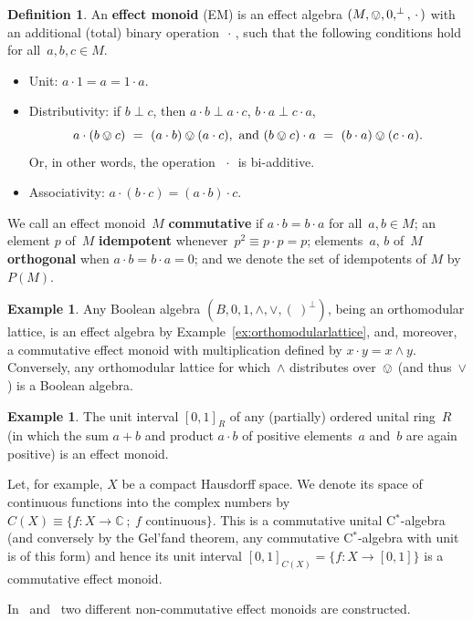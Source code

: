 \documentclass[10pt,conference]{IEEEtran}
\newcommand{\CC}{\mathbb{C}}
\newcommand\Define[1]{\textbf{#1}}
\newcounter{counter}
\theoremstyle{definition}
\newtheorem{definition}[counter]{Definition}
\newtheorem{example}[counter]{Example}
\begin{document}
\begin{definition}\label{def:effectmonoid}
    An \Define{effect monoid} (EM) is an effect algebra $(M,\ovee, 0, ^\perp,
    \,\cdot\,)$ with an additional (total) binary operation $\,\cdot\,$,
such that the following conditions hold 
    for all~$a,b,c \in M$.
\begin{itemize}
\item Unit: $a\cdot 1 = a = 1\cdot a$.
\item Distributivity: if $b\perp c$, then $a\cdot b\perp  a\cdot c$,\quad
    $b\cdot a\perp c\cdot a$,
        $$a\cdot (b\ovee c) \ =\  (a\cdot b) \ovee (a\cdot c),\ \text{and}\ 
(b\ovee c)\cdot a \ =\  (b\cdot a) \ovee (c\cdot a).$$
Or, in other words,
    the operation~$\,\cdot\,$ is bi-additive.
\item Associativity: $a \cdot (b\cdot c) = (a \cdot b) \cdot c$.
\end{itemize}
We call an effect monoid~$M$ \Define{commutative} if $a\cdot b = b \cdot a$
    for all~$a,b \in M$;
an element $p$ of~$M$  \Define{idempotent}
whenever~$p^2 \equiv p \cdot p = p$;
elements~$a$, $b$  of~$M$ \Define{orthogonal}
when $a\cdot b = b\cdot a = 0$;
and we denote the set of idempotents of $M$ by~$P(M)$.
\end{definition}

\begin{example}\label{ex:booleanalgebra}
Any Boolean algebra  $(B,0,1,\wedge,\vee,(\ )^\perp)$,
    being an orthomodular lattice,
    is an effect algebra by Example~\ref{ex:orthomodularlattice},
and, moreover,  a commutative effect monoid with
    multiplication defined by $x \cdot y= x \wedge y$.
    Conversely,
    any orthomodular lattice
    for which~$\wedge$ distributes over~$\ovee$ (and thus~$\vee$)
    is a Boolean algebra.
\end{example}

\begin{example}\label{ex:CX}
    The unit interval $[0,1]_R$ of any (partially)
    ordered unital ring~$R$
    (in which the sum $a+b$ and product $a\cdot b$
    of positive elements~$a$ and~$b$ are again positive)
    is an effect monoid.

    Let, for example, $X$ be a compact Hausdorff space. We denote its space of
    continuous functions into the complex numbers by
    $C(X)\equiv\{f:X\rightarrow \CC~;~f \text{ continuous}\}$. This is
    a commutative unital C$^*$-algebra
    (and conversely by the Gel'fand theorem, any
    commutative C$^*$-algebra with unit is of this form) and hence its
    unit interval $[0,1]_{C(X)} = \{f:X\rightarrow [0,1]\}$ is a
    commutative effect monoid.

    In~\cite[Ex.~4.3.9]{kentathesis} and~\cite[Cor.~51]{basmaster}
        two different non-commutative effect monoids are constructed.
\end{example}
\end{document}

